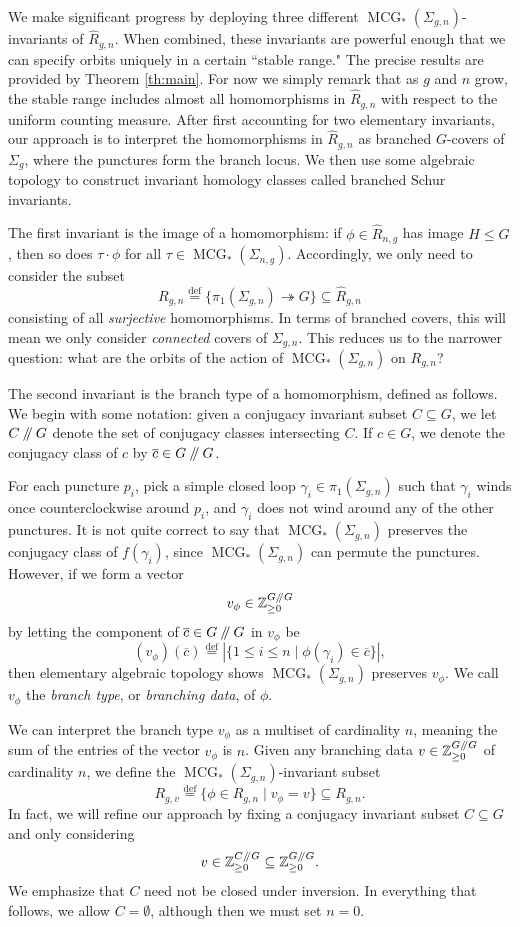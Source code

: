 \documentclass[10pt,twocolumn,amsmath,amssymb,aps,pra,secnumarabic,
    nofootinbib,groupedaddress]{revtex4-1}
\newcommand{\defeq}{\stackrel{\mathrm{def}}=}
\newcommand{\Z}{\mathbb{Z}}
\newcommand{\onto}{\twoheadrightarrow}
\newcommand{\sslash}{\mathbin{/\mkern-5mu/}}
\newcommand{\mcg}[1]{\operatorname{MCG}_*(\Sigma_{#1})}
\newcommand{\sfc}[1]{\Sigma_{#1}}
\newcommand{\hR}{\hat{R}}
\newcommand{\ov}[1]{\overline{#1}}
\begin{document}
We make significant progress by deploying three different $\mcg{g,n}$-invariants of $\hR_{g,n}$.  When combined, these invariants are powerful enough that we can specify orbits uniquely in a certain ``stable range."  The precise results are provided by Theorem \ref{th:main}.  For now we simply remark that as $g$ and $n$ grow, the stable range includes almost all homomorphisms in $\hR_{g,n}$ with respect to the uniform counting measure.  After first accounting for two elementary invariants, our approach is to interpret the homomorphisms in $\hR_{g,n}$ as branched $G$-covers of $\Sigma_g$, where the punctures form the branch locus.  We then use some algebraic topology to construct invariant homology classes called branched Schur invariants.

The first invariant is the image of a homomorphism: if $\phi \in \hR_{n,g}$ has image $H \leq G$, then so does $\tau \cdot \phi$ for all $\tau \in \mcg{n,g}$.  Accordingly, we only need to consider the subset
\[ R_{g,n} \defeq \{ \pi_1(\Sigma_{g,n}) \onto G \} \subseteq \hR_{g,n} \]
consisting of all \emph{surjective} homomorphisms.  In terms of branched covers, this will mean we only consider \emph{connected} covers of $\sfc{g,n}$.  This reduces us to the narrower question: what are the orbits of the action of $\mcg{g,n}$ on $R_{g,n}$?

The second invariant is the branch type of a homomorphism, defined as follows.  We begin with some notation: given a conjugacy invariant subset $C \subseteq G$, we let $C\sslash G$ denote the set of conjugacy classes intersecting $C$.  If $c \in G$, we denote the conjugacy class of $c$ by $\ov{c} \in G\sslash G$.

For each puncture $p_i$, pick a simple closed loop $\gamma_i \in \pi_1(\sfc{g,n})$ such that $\gamma_i$ winds once counterclockwise around $p_i$, and $\gamma_i$ does not wind around any of the other punctures.  It is not quite correct to say that $\mcg{g,n}$ preserves the conjugacy class of $f(\gamma_i)$, since $\mcg{g,n}$ can permute the punctures.  However, if we form a vector
\[ v_\phi \in \Z_{\geq 0}^{G\sslash G} \]
by letting the component of $\ov{c} \in G\sslash G$ in $v_\phi$ be
\[ (v_\phi)(\ov{c}) \defeq |\{ 1 \leq i \leq n \mid \phi(\gamma_i) \in \ov{c} \}|, \]
then elementary algebraic topology shows $\mcg{g,n}$ preserves $v_\phi$.  We call $v_\phi$ the \emph{branch type}, or \emph{branching data}, of $\phi$.

We can interpret the branch type $v_\phi$ as a multiset of cardinality $n$,  meaning the sum of the entries of the vector $v_\phi$ is $n$.  Given any branching data $v \in \Z_{\geq 0}^{G\sslash G}$ of cardinality $n$, we define the $\mcg{g,n}$-invariant subset
\[ R_{g,v} \defeq \{ \phi \in R_{g,n} \mid v_\phi = v \} \subseteq R_{g,n}. \]
In fact, we will refine our approach by fixing a conjugacy invariant subset $C \subseteq G$ and only considering
\[ v \in \Z_{\geq 0}^{C\sslash G} \subseteq \Z_{\geq 0}^{G\sslash G}. \]
We emphasize that $C$ need not be closed under inversion.  In everything that follows, we allow $C = \emptyset$, although then we must set $n=0$.
\end{document}
